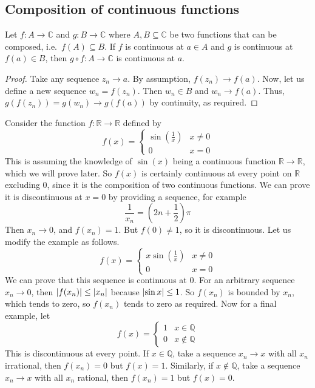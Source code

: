 \subsection{Composition of continuous functions}
\begin{theorem}
	Let \(f \colon A \to \mathbb C\) and \(g \colon B \to \mathbb C\) where \(A, B \subseteq \mathbb C\) be two functions that can be composed, i.e.\ \(f(A) \subseteq B\).
	If \(f\) is continuous at \(a \in A\) and \(g\) is continuous at \(f(a) \in B\), then \(g \circ f \colon A \to \mathbb C\) is continuous at \(a\).
\end{theorem}
\begin{proof}
	Take any sequence \(z_n \to a\).
	By assumption, \(f(z_n) \to f(a)\).
	Now, let us define a new sequence \(w_n = f(z_n)\).
	Then \(w_n \in B\) and \(w_n \to f(a)\).
	Thus, \(g(f(z_n)) = g(w_n) \to g(f(a))\) by continuity, as required.
\end{proof}
Consider the function \(f\colon \mathbb R \to \mathbb R\) defined by
\[
	f(x) = \begin{cases}
		\sin\left( \frac{1}{x} \right) & x \neq 0 \\
		0                              & x = 0
	\end{cases}
\]
This is assuming the knowledge of \(\sin(x)\) being a continuous function \(\mathbb R\to \mathbb R\), which we will prove later.
So \(f(x)\) is certainly continuous at every point on \(\mathbb R\) excluding 0, since it is the composition of two continuous functions.
We can prove it is discontinuous at \(x=0\) by providing a sequence, for example
\[
	\frac{1}{x_n} = \left(2n + \frac{1}{2}\right)\pi
\]
Then \(x_n \to 0\), and \(f(x_n) = 1\).
But \(f(0) \neq 1\), so it is discontinuous.
Let us modify the example as follows.
\[
	f(x) = \begin{cases}
		x\sin\left( \frac{1}{x} \right) & x \neq 0 \\
		0                               & x = 0
	\end{cases}
\]
We can prove that this sequence is continuous at 0.
For an arbitrary sequence \(x_n \to 0\), then \(\abs{f(x_n)} \leq \abs{x_n}\) because \(\abs{\sin x} \leq 1\).
So \(f(x_n)\) is bounded by \(x_n\), which tends to zero, so \(f(x_n)\) tends to zero as required.
Now for a final example, let
\[
	f(x) = \begin{cases}
		1 & x \in \mathbb Q    \\
		0 & x \notin \mathbb Q
	\end{cases}
\]
This is discontinuous at every point.
If \(x \in \mathbb Q\), take a sequence \(x_n \to x\) with all \(x_n\) irrational, then \(f(x_n) = 0\) but \(f(x) = 1\).
Similarly, if \(x \notin \mathbb Q\), take a sequence \(x_n \to x\) with all \(x_n\) rational, then \(f(x_n) = 1\) but \(f(x) = 0\).
